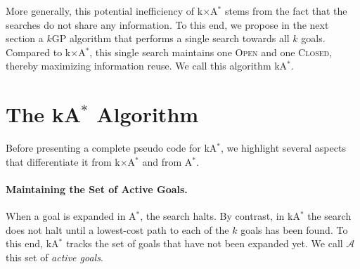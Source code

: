 \documentclass[twoside,11pt]{article}
\newcommand{\kgs}{$k$GP\xspace}
\newcommand{\astar}{A$^*$\xspace}
\newcommand{\kastar}{kA$^*$\xspace}
\newcommand{\kxastar}{k$\times$A$^*$\xspace}
\newcommand{\open}{\textsc{Open}\xspace}
\newcommand{\closed}{\textsc{Closed}\xspace}
\newcommand{\activeg}{\mathcal{A}}
\begin{document}
More generally, this potential inefficiency of \kxastar stems from the fact that the searches do not share any information. To this end, we propose in the next section a \kgs algorithm that performs a single search towards all $k$ goals. Compared to \kxastar, this single search maintains one  \open and one \closed, thereby maximizing information reuse. We call this algorithm \kastar. 



\section{The \kastar Algorithm}
\label{sec:one-k-goal-search}

Before presenting a complete pseudo code for \kastar, we highlight several aspects that differentiate it from \kxastar and from \astar.



\paragraph{Maintaining the Set of Active Goals.}
When a goal is expanded in \astar, the search halts.
By contrast, in \kastar the search does not halt until a lowest-cost path to each of the $k$ goals has been found.
To this end, \kastar tracks the set of goals that have not been expanded yet. 
We call $\activeg$ this set of \emph{active goals}.

\end{document}
